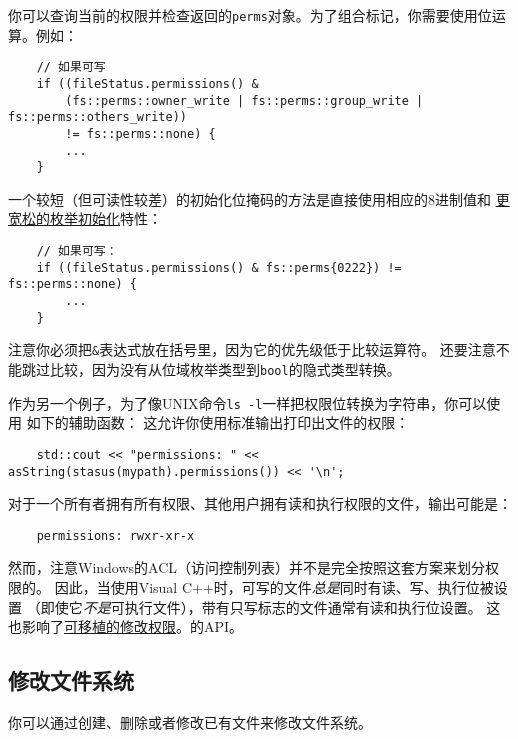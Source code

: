 你可以查询当前的权限并检查返回的\texttt{perms}对象。为了组合标记，你需要使用位运算。例如：
\begin{lstlisting}
    // 如果可写
    if ((fileStatus.permissions() &
        (fs::perms::owner_write | fs::perms::group_write | fs::perms::others_write))
        != fs::perms::none) {
        ...
    }
\end{lstlisting}
一个较短（但可读性较差）的初始化位掩码的方法是直接使用相应的8进制值和
\hyperref[ch8.3]{更宽松的枚举初始化}特性：
\begin{lstlisting}
    // 如果可写：
    if ((fileStatus.permissions() & fs::perms{0222}) != fs::perms::none) {
        ...
    }
\end{lstlisting}
注意你必须把\texttt{\&}表达式放在括号里，因为它的优先级低于比较运算符。
还要注意不能跳过比较，因为没有从位域枚举类型到\texttt{bool}的隐式类型转换。

作为另一个例子，为了像UNIX命令\texttt{ls -l}一样把权限位转换为字符串，你可以使用
如下的辅助函数：
这允许你使用标准输出打印出文件的权限：
\begin{lstlisting}
    std::cout << "permissions: " << asString(stasus(mypath).permissions()) << '\n';
\end{lstlisting}
对于一个所有者拥有所有权限、其他用户拥有读和执行权限的文件，输出可能是：
\begin{lstlisting}
    permissions: rwxr-xr-x
\end{lstlisting}
然而，注意Windows的ACL（访问控制列表）并不是完全按照这套方案来划分权限的。
因此，当使用Visual C++时，可写的文件\emph{总是}同时有读、写、执行位被设置
（即使它\emph{不是}可执行文件），带有只写标志的文件通常有读和执行位设置。
这也影响了\hyperref[可移植的修改权限]{可移植的修改权限}。\label{ACL}的API。

\subsection{修改文件系统}
你可以通过创建、删除或者修改已有文件来修改文件系统。


